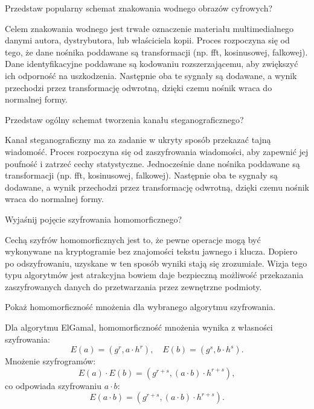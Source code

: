\documentclass[answers,11pt]{exam}
\begin{document}
\begin{questions}
\question Przedstaw popularny schemat znakowania wodnego obrazów cyfrowych?
\begin{solution}
Celem znakowania wodnego jest trwałe oznaczenie materiału multimedialnego danymi autora, dystrybutora, lub właściciela kopii. Proces rozpoczyna się od tego, że dane nośnika poddawane są transformacji (np. fft, kosinusowej, falkowej). Dane identyfikacyjne poddawane są kodowaniu rozszerzającemu, aby zwiększyć ich odporność na uszkodzenia. Następnie oba te sygnały są dodawane, a wynik przechodzi przez transformację odwrotną, dzięki czemu nośnik wraca do normalnej formy.
\end{solution}

\question Przedstaw ogólny schemat tworzenia kanału steganograficznego?
\begin{solution}
Kanał steganograficzny ma za zadanie w ukryty sposób przekazać tajną wiadomość. Proces rozpoczyna się od zaszyfrowania wiadomości, aby zapewnić jej poufność i zatrzeć cechy statystyczne. Jednocześnie dane nośnika poddawane są transformacji (np. fft, kosinusowej, falkowej). Następnie oba te sygnały są dodawane, a wynik przechodzi przez transformację odwrotną, dzięki czemu nośnik wraca do normalnej formy.
\end{solution}

\question Wyjaśnij pojęcie szyfrowania homomorficznego?
\begin{solution}
Cechą szyfrów homomorficznych jest to, że pewne operacje mogą być wykonywane na kryptogramie bez znajomości tekstu jawnego i klucza. Dopiero po odszyfrowaniu, uzyskane w ten sposób wyniki stają się zrozumiałe. Wizja tego typu algorytmów jest atrakcyjna bowiem daje bezpieczną możliwość przekazania zaszyfrowanych danych do przetwarzania przez zewnętrzne podmioty.    
\end{solution}



\question Pokaż homomorficzność mnożenia dla wybranego algorytmu szyfrowania.
\begin{solution}
Dla algorytmu ElGamal, homomorficzność mnożenia wynika z własności szyfrowania:
\[
E(a) = (g^r, a \cdot h^r), \quad E(b) = (g^s, b \cdot h^s).
\]
Mnożenie szyfrogramów:
\[
E(a) \cdot E(b) = (g^{r+s}, (a \cdot b) \cdot h^{r+s}),
\]
co odpowiada szyfrowaniu \(a \cdot b\):
\[
E(a \cdot b) = (g^{r+s}, (a \cdot b) \cdot h^{r+s}).
\]
\end{solution}
\end{questions}
\end{document}
